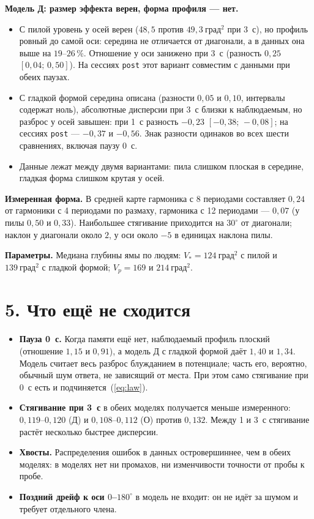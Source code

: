 \documentclass[10pt,a4paper]{article}
\newcommand{\gr}{^{\circ}}
\newcommand{\ci}[2]{$[#1;\,#2]$}
\newcommand{\dsq}{\text{град}^2}
\begin{document}
\textbf{Модель Д: размер эффекта верен, форма профиля --- нет.}
\begin{itemize}
\item С пилой уровень у осей верен ($48{,}5$ против $49{,}3~\dsq$ при 3~с), но профиль ровный до самой оси: середина
не отличается от диагонали, а в данных она выше на $19$--$26\,\%$. Отношение у оси занижено при 3~с
(разность $0{,}25$ \ci{0{,}04}{0{,}50}). На сессиях \texttt{post} этот вариант совместим с данными при обеих паузах.
\item С гладкой формой середина описана (разности $0{,}05$ и $0{,}10$, интервалы содержат ноль), абсолютные дисперсии
при 3~с близки к наблюдаемым, но разброс у осей завышен: при 1~с разность $-0{,}23$ \ci{-0{,}38}{-0{,}08}; на сессиях
\texttt{post} --- $-0{,}37$ и $-0{,}56$. Знак разности одинаков во всех шести сравнениях, включая паузу 0~с.
\item Данные лежат между двумя вариантами: пила слишком плоская в середине, гладкая форма слишком крутая у осей.
\end{itemize}

\textbf{Измеренная форма.} В средней карте гармоника с 8 периодами составляет $0{,}24$ от гармоники с 4 периодами по
размаху, гармоника с 12 периодами --- $0{,}07$ (у пилы $0{,}50$ и $0{,}33$). Наибольшее стягивание приходится на
$30\gr$ от диагонали; наклон у диагонали около $2$, у оси около $-5$ в единицах наклона пилы.

\textbf{Параметры.} Медиана глубины ямы по людям: $V_*=124~\dsq$ с пилой и $139~\dsq$ с гладкой формой;
$V_p=169$ и $214~\dsq$.

\section*{5. Что ещё не сходится}

\begin{itemize}
\item \textbf{Пауза 0~с.} Когда памяти ещё нет, наблюдаемый профиль плоский (отношение $1{,}15$ и $0{,}91$), а модель Д
с гладкой формой даёт $1{,}40$ и $1{,}34$. Модель считает весь разброс блужданием в потенциале; часть его, вероятно,
обычный шум ответа, не зависящий от места. При этом само стягивание при 0~с есть и подчиняется~(\ref{eq:law}).
\item \textbf{Стягивание при 3~с} в обеих моделях получается меньше измеренного: $0{,}119$--$0{,}120$ (Д) и
$0{,}108$--$0{,}112$ (О) против $0{,}132$. Между 1 и 3~с стягивание растёт несколько быстрее дисперсии.
\item \textbf{Хвосты.} Распределения ошибок в данных островершиннее, чем в обеих моделях: в моделях нет ни промахов,
ни изменчивости точности от пробы к пробе.
\item \textbf{Поздний дрейф к оси $0$--$180\gr$} в модель не входит: он не идёт за шумом и требует отдельного члена.
\end{itemize}
\end{document}
